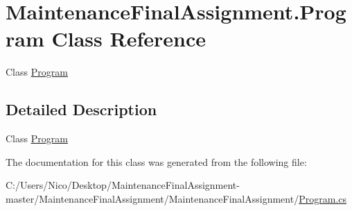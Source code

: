 \hypertarget{class_maintenance_final_assignment_1_1_program}{}\section{Maintenance\+Final\+Assignment.\+Program Class Reference}
\label{class_maintenance_final_assignment_1_1_program}


Class \hyperlink{class_maintenance_final_assignment_1_1_program}{Program}  




\subsection{Detailed Description}
Class \hyperlink{class_maintenance_final_assignment_1_1_program}{Program} 



The documentation for this class was generated from the following file\+:\begin{DoxyCompactItemize}
\item 
C\+:/\+Users/\+Nico/\+Desktop/\+Maintenance\+Final\+Assignment-\/master/\+Maintenance\+Final\+Assignment/\+Maintenance\+Final\+Assignment/\hyperlink{_program_8cs}{Program.\+cs}\end{DoxyCompactItemize}
